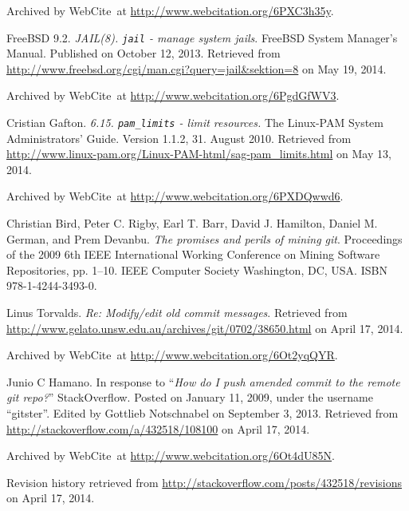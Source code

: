 \begin{thebibliography}{9}
Archived by WebCite\textsuperscript{\textregistered}\ at
\url{http://www.webcitation.org/6PXC3h35y}.


FreeBSD 9.2. \emph{JAIL(8). \texttt{jail} - manage system jails}. FreeBSD
System Manager's Manual. Published on October 12, 2013. Retrieved from
\url{http://www.freebsd.org/cgi/man.cgi?query=jail\&sektion=8} on May 19, 2014.

Archived by WebCite\textsuperscript{\textregistered}\ at
\url{http://www.webcitation.org/6PgdGfWV3}.


Cristian Gafton. \emph{6.15. \texttt{pam\_limits} - limit resources.} The
Linux-PAM System Administrators' Guide. Version 1.1.2, 31. August 2010.
Retrieved from
\url{http://www.linux-pam.org/Linux-PAM-html/sag-pam_limits.html} on May 13,
2014.

Archived by WebCite\textsuperscript{\textregistered}\ at
\url{http://www.webcitation.org/6PXDQwwd6}.


Christian Bird, Peter C. Rigby, Earl T. Barr, David J. Hamilton, Daniel M.
German, and Prem Devanbu. \emph{The promises and perils of mining git}.
Proceedings of the 2009 6th IEEE International Working Conference on Mining
Software Repositories, pp. 1--10. IEEE Computer Society Washington, DC, USA.
ISBN 978-1-4244-3493-0.


Linus Torvalds. \emph{Re: Modify/edit old commit messages}. Retrieved from
\url{http://www.gelato.unsw.edu.au/archives/git/0702/38650.html} on April 17,
2014.

Archived by WebCite\textsuperscript{\textregistered}\ at
\url{http://www.webcitation.org/6Ot2yqQYR}.


Junio C Hamano. In response to ``\emph{How do I push amended commit to the remote
git repo?}'' StackOverflow. Posted on January 11, 2009, under the username
``gitster''. Edited by Gottlieb Notschnabel on September 3, 2013. Retrieved
from \url{http://stackoverflow.com/a/432518/108100} on April 17, 2014.

Archived by WebCite\textsuperscript{\textregistered}\ at
\url{http://www.webcitation.org/6Ot4dU85N}.

Revision history retrieved from
\url{http://stackoverflow.com/posts/432518/revisions} on April 17, 2014.


\end{thebibliography}
